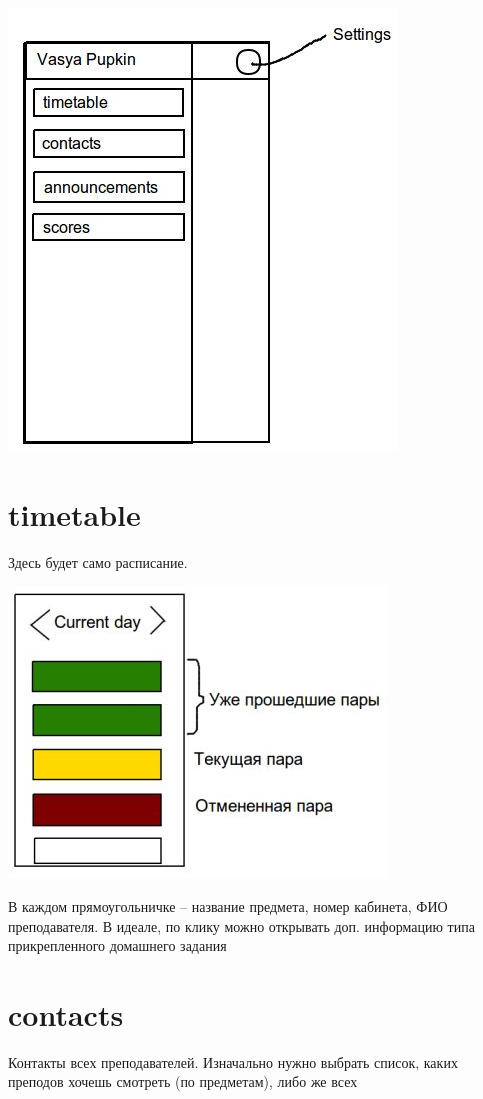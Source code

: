 \documentclass[12pt]{article}
\begin{document}
\includegraphics{term3.jpg}

\section{timetable}
Здесь будет само расписание. 

\includegraphics{timetable.jpg}

В каждом прямоугольничке -- название предмета, номер кабинета, ФИО 
преподавателя. В идеале, по клику можно открывать доп. информацию 
типа прикрепленного домашнего задания

\section{contacts}
Контакты всех преподавателей. Изначально нужно выбрать список, каких преподов
хочешь смотреть (по предметам), либо же всех
\end{document}
